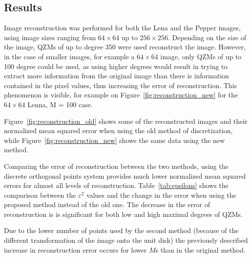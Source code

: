 \subsection{Results}
Image reconstruction was performed for both the Lena and the Pepper images, using image sizes ranging from $64\times 64$ up to $256 \times 256$. Depending on the size of the image, QZMs of up to degree 350 were used reconstruct the image. However, in the case of smaller images, for example a $64\times 64$ image, only QZMs of up to 100 degree could be used, as using higher degrees would result in trying to extract more information from the original image than there is information contained in the pixel values, thus increasing the error of reconstruction. This phenomenon is visible, for example on Figure~\ref{fig:reconstruction_new} for the $64 \times 64$ Lenna, M = 100 case.

Figure~\ref{fig:reconstruction_old} shows some of the reconstructed images and their normalized mean squared error when using the old method of discretization, while Figure~\ref{fig:reconstruction_new} shows the same data using the new method.

Comparing the error of reconstruction between the two methods, using the discrete orthogonal points system provides much lower normalized mean squared errors for almost all levels of reconstruction. 
Table~\ref{tab:epsilons} shows the comparison between the $\varepsilon^2$ values and the change in the error when using the proposed method instead of the old one. The decrease in the error of reconstruction is is significant for both low and high maximal degrees of QZMs. 

Due to the lower number of points used by the second method (because of the different transformation of the image onto the unit disk) the previously described increase in reconstruction error occurs for lower $M$s than in the original method.



